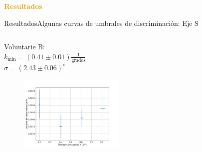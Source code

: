 \documentclass[
    11pt, %
    aspectratio=169, %
]{beamer}
\begin{document}
\begin{frame}
    \begin{center}
        \Huge \textbf{\textcolor{orange}{Resultados}}

    \end{center}
\end{frame}






\begin{frame}{Resultados}{Algunas curvas de umbrales de discriminación: Eje S}
    \begin{columns}[c] %

    
		\begin{column}{0.50\textwidth} %
            \begin{center}
                Voluntarie B: \\ $k_{\text{min}} = (0.41 \pm 0.01)\frac{1}{\text{grados}}$ \\ $\sigma = (2.43 \pm 0.06)^\circ$
            \end{center}
            
               
                     \begin{figure}[h!]
                    \centering
                    \includegraphics[angle=0, width=5cm]{Images/resultados/bauti_s.png}
                \end{figure}
               
        
               
		\end{column}


\end{columns}
\end{frame}
\end{document}
